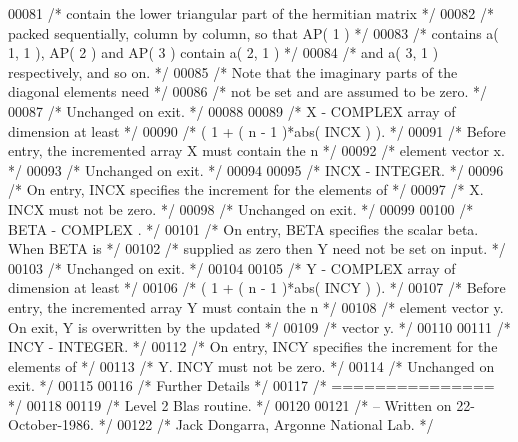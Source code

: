 \begin{DoxyCode}
00081 \textcolor{comment}{/*           contain the lower triangular part of the hermitian matrix */}
00082 \textcolor{comment}{/*           packed sequentially, column by column, so that AP( 1 ) */}
00083 \textcolor{comment}{/*           contains a( 1, 1 ), AP( 2 ) and AP( 3 ) contain a( 2, 1 ) */}
00084 \textcolor{comment}{/*           and a( 3, 1 ) respectively, and so on. */}
00085 \textcolor{comment}{/*           Note that the imaginary parts of the diagonal elements need */}
00086 \textcolor{comment}{/*           not be set and are assumed to be zero. */}
00087 \textcolor{comment}{/*           Unchanged on exit. */}
00088 
00089 \textcolor{comment}{/*  X      - COMPLEX          array of dimension at least */}
00090 \textcolor{comment}{/*           ( 1 + ( n - 1 )*abs( INCX ) ). */}
00091 \textcolor{comment}{/*           Before entry, the incremented array X must contain the n */}
00092 \textcolor{comment}{/*           element vector x. */}
00093 \textcolor{comment}{/*           Unchanged on exit. */}
00094 
00095 \textcolor{comment}{/*  INCX   - INTEGER. */}
00096 \textcolor{comment}{/*           On entry, INCX specifies the increment for the elements of */}
00097 \textcolor{comment}{/*           X. INCX must not be zero. */}
00098 \textcolor{comment}{/*           Unchanged on exit. */}
00099 
00100 \textcolor{comment}{/*  BETA   - COMPLEX         . */}
00101 \textcolor{comment}{/*           On entry, BETA specifies the scalar beta. When BETA is */}
00102 \textcolor{comment}{/*           supplied as zero then Y need not be set on input. */}
00103 \textcolor{comment}{/*           Unchanged on exit. */}
00104 
00105 \textcolor{comment}{/*  Y      - COMPLEX          array of dimension at least */}
00106 \textcolor{comment}{/*           ( 1 + ( n - 1 )*abs( INCY ) ). */}
00107 \textcolor{comment}{/*           Before entry, the incremented array Y must contain the n */}
00108 \textcolor{comment}{/*           element vector y. On exit, Y is overwritten by the updated */}
00109 \textcolor{comment}{/*           vector y. */}
00110 
00111 \textcolor{comment}{/*  INCY   - INTEGER. */}
00112 \textcolor{comment}{/*           On entry, INCY specifies the increment for the elements of */}
00113 \textcolor{comment}{/*           Y. INCY must not be zero. */}
00114 \textcolor{comment}{/*           Unchanged on exit. */}
00115 
00116 \textcolor{comment}{/*  Further Details */}
00117 \textcolor{comment}{/*  =============== */}
00118 
00119 \textcolor{comment}{/*  Level 2 Blas routine. */}
00120 
00121 \textcolor{comment}{/*  -- Written on 22-October-1986. */}
00122 \textcolor{comment}{/*     Jack Dongarra, Argonne National Lab. */}

\end{DoxyCode}
